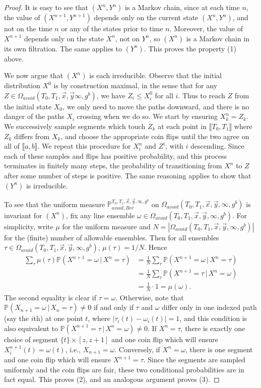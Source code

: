 \documentclass[12pt]{article}
\begin{document}
\begin{proof}
	It is easy to see that $(X^n,Y^n)$ is a Markov chain, since at each time $n$, the value of $(X^{n+1},Y^{n+1})$ depends only on the current state $(X^n,Y^n)$, and not on the time $n$ or any of the states prior to time $n$. Moreover, the value of $X^{n+1}$ depends only on the state $X^n$, not on $Y^n$, so $(X^n)$ is a Markov chain in its own filtration. The same applies to $(Y^n)$. This proves the property (1) above.
	
	We now argue that $(X^n)$ is each irreducible. Observe that the initial distribution $X^0$ is by construction maximal, in the sense that for any $Z\in \Omega_{avoid}(T_0,T_1,\vec{x},\vec{y}\infty,g^b)$, we have $Z_i \leq X^0_i$ for all $i$. Thus to reach $Z$ from the initial state $X_0$, we only need to move the paths downward, and there is no danger of the paths $X_i$ crossing when we do so. We start by ensuring $X^n_k = Z_k$. We successively sample segments which touch $Z_k$ at each point in $\llbracket T_0,T_1\rrbracket$ where $Z_k$ differs from $X_k$, and choose the appropriate coin flips until the two agree on all of $\llbracket a,b\rrbracket$. We repeat this procedure for $X^n_i$ and $Z^i$, with $i$ descending. Since each of these samples and flips has positive probability, and this process terminates in finitely many steps, the probability of transitioning from $X^n$ to $Z$ after some number of steps is positive. The same reasoning applies to show that $(Y^n)$ is irreducible.
	
	To see that the uniform measure $\mathbb{P}_{avoid,Ber}^{T_0,T_1,\vec{x},\vec{y},\infty,g^b}$ on $\Omega_{avoid}(T_0,T_1,\vec{x},\vec{y},\infty,g^b)$ is invariant for $(X^n)$, fix any line ensemble $\omega\in\Omega_{avoid}(T_0,T_1,\vec{x},\vec{y},\infty,g^b)$. For simplicity, write $\mu$ for the uniform measure and $N=|\Omega_{avoid}(T_0,T_1,\vec{x},\vec{y},\infty,g^b)|$ for the (finite) number of allowable ensembles. Then for all ensembles $\tau\in\Omega_{avoid}(T_0,T_1,\vec{x},\vec{y},\infty,g^b)$, $\mu(\tau) = 1/N$. Hence
	\begin{align*}
	\sum_\tau \mu(\tau)\mathbb{P}(X^{n+1} = \omega\,|\,X^n = \tau) &= \frac{1}{N}\sum_\tau \mathbb{P}(X^{n+1} = \omega\,|\,X^n = \tau)\\
	&= \frac{1}{N}\sum_\tau \mathbb{P}(X^{n+1} = \tau\,|\,X^n = \omega)\\
	&= \frac{1}{N}\cdot 1 = \mu(\omega).
	\end{align*}
	The second equality is clear if $\tau=\omega$. Otherwise, note that $\mathbb{P}(X_{n+1} = \omega\,|\,X_n = \tau) \neq 0$ if and only if $\tau$ and $\omega$ differ only in one indexed path (say the $i$th) at one point $t$, where $|\tau_i(t)-\omega_i(t)|=1$, and this condition is also equivalent to $\mathbb{P}(X^{n+1} = \tau\,|\,X^n = \omega) \neq 0$. If $X^n=\tau$, there is exactly one choice of segment $\{t\}\times[z,z+1]$ and one coin flip which will ensure $X^{n+1}_i(t)=\omega(t)$, i.e., $X_{n+1}=\omega$. Conversely, if $X^n=\omega$, there is one segment and one coin flip which will ensure $X^{n+1}=\tau$. Since the segments are sampled uniformly and the coin flips are fair, these two conditional probabilities are in fact equal. This proves (2), and an analogous argument proves (3).
	

\end{proof}
\end{document}
